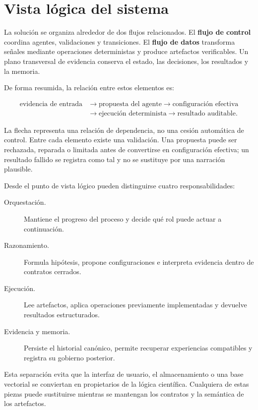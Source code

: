 \section{Vista lógica del sistema}

La solución se organiza alrededor de dos flujos relacionados. El
\textbf{flujo de control} coordina agentes, validaciones y transiciones. El
\textbf{flujo de datos} transforma señales mediante operaciones
deterministas y produce artefactos verificables. Un plano transversal de
evidencia conserva el estado, las decisiones, los resultados y la memoria.

De forma resumida, la relación entre estos elementos es:

\[
\begin{aligned}
\text{evidencia de entrada}
&\longrightarrow \text{propuesta del agente}
\longrightarrow \text{configuración efectiva} \\
&\longrightarrow \text{ejecución determinista}
\longrightarrow \text{resultado auditable}.
\end{aligned}
\]

La flecha representa una relación de dependencia, no una cesión automática de
control. Entre cada elemento existe una validación. Una propuesta puede ser
rechazada, reparada o limitada antes de convertirse en configuración efectiva;
un resultado fallido se registra como tal y no se sustituye por una narración
plausible.

Desde el punto de vista lógico pueden distinguirse cuatro responsabilidades:

\begin{description}
  \item[Orquestación.] Mantiene el progreso del proceso y decide qué rol puede
        actuar a continuación.
  \item[Razonamiento.] Formula hipótesis, propone configuraciones e interpreta
        evidencia dentro de contratos cerrados.
  \item[Ejecución.] Lee artefactos, aplica operaciones previamente
        implementadas y devuelve resultados estructurados.
  \item[Evidencia y memoria.] Persiste el historial canónico, permite recuperar
        experiencias compatibles y registra su gobierno posterior.
\end{description}

Esta separación evita que la interfaz de usuario, el almacenamiento o una base
vectorial se conviertan en propietarios de la lógica científica. Cualquiera de
estas piezas puede sustituirse mientras se mantengan los contratos y la
semántica de los artefactos.

